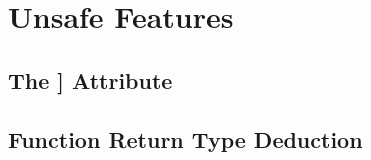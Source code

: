 
\chapter[Unsafe Features]{Unsafe Features}\label{ch-unsafe}

\renewcommand{\cppxx}{C++11}

\newpage
{}
 \section[{\tt [[carries\_dependency]]}\hspace*{1em}(The {\tt [[carries\_dependency]]} Attribute)]{The {\SecCode [[carries\_dependency]]} Attribute}\label{carriesdependency}




\renewcommand{\cppxx}{C++14}

\newpage
{}
 \section[Deduced Return Types\hspace*{1em}(Function Return Type Deduction)]{Function Return Type Deduction}\label{Function-Return-Type-Deduction}
\renewcommand{\cppxx}{C++14}



